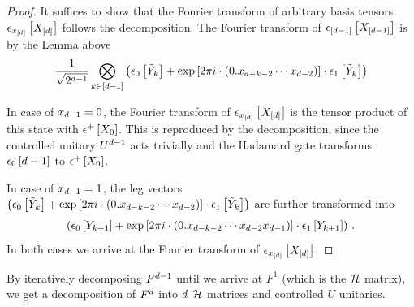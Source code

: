 \begin{proof}
    It suffices to show that the Fourier transform of arbitrary basis tensors $\epsilon_{x_{[d]}}\left[X_{[d]}\right]$ follows the decomposition.
    The Fourier transform of $\epsilon_{[d-1]}\left[X_{[d-1]}\right]$ is by the Lemma above
    \begin{align*}
        \frac{1}{\sqrt{2^{d-1}}} \bigotimes_{k\in[d-1]}
        \left( \epsilon_{0}\left[\tilde{Y}_{k}\right] + \mathrm{exp}\left[2\pi i \cdot (0.x_{d-k-2}\cdots x_{d-2})\right]\cdot \epsilon_{1}\left[\tilde{Y}_{k}\right]\right)
    \end{align*}

    In case of $x_{d-1}=0$, the Fourier transform of $\epsilon_{x_{[d]}}\left[X_{[d]}\right]$ is the tensor product of this state with $\epsilon^{+}\left[X_{0}\right]$.
    This is reproduced by the decomposition, since the controlled unitary $U^{d-1}$ acts trivially and the Hadamard gate transforms $\epsilon_{0}\left[d-1\right]$ to $\epsilon^{+}\left[X_{0}\right]$.

    In case of $x_{d-1}=1$, the leg vectors $\left( \epsilon_{0}\left[\tilde{Y}_{k}\right] + \mathrm{exp}\left[2\pi i \cdot (0.x_{d-k-2}\cdots x_{d-2})\right]\cdot \epsilon_{1}\left[\tilde{Y}_{k}\right]\right)$ are further transformed into
    \begin{align*}
        \left( \epsilon_{0}\left[Y_{k+1}\right] + \mathrm{exp}\left[2\pi i \cdot (0.x_{d-k-2}\cdots x_{d-2}x_{d-1})\right]\cdot \epsilon_{1}\left[Y_{k+1}\right]\right) \, .
    \end{align*}
    In both cases we arrive at the Fourier transform of $\epsilon_{x_{[d]}}\left[X_{[d]}\right]$.
\end{proof}

By iteratively decomposing $F^{d-1}$ until we arrive at $F^{1}$ (which is the $\mathcal{H}$ matrix), we get a decomposition of $F^{d}$ into $d$ $\mathcal{H}$ matrices and controlled $U$ unitaries.

